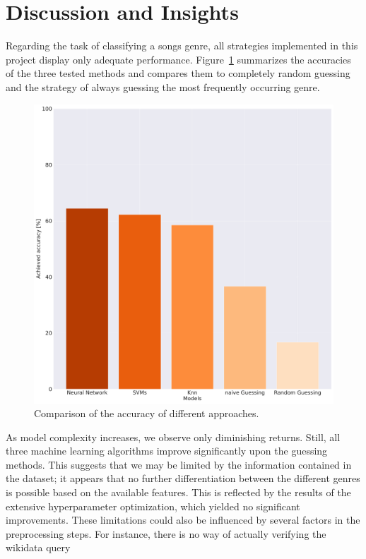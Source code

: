 \documentclass[
  12pt,
  bibliography=totoc,     %
  captions=tableheading,  %
  titlepage=firstiscover, %
]{scrartcl}
\begin{document}
\section{Discussion and Insights}
Regarding the task of classifying a songs genre, all strategies implemented in this project display only adequate performance. Figure~\ref{fig:performance_comp}
summarizes the accuracies of the three tested methods and compares them to completely random guessing and the strategy of always guessing the most frequently occurring
genre.
\begin{figure}[H]
  \centering
  \includegraphics[scale=0.25]{figures/performance-comparison.pdf}
  \caption{Comparison of the accuracy of different approaches.}
  \label{fig:performance_comp}
\end{figure}
\noindent
As model complexity increases, we observe only diminishing returns. Still, all three machine learning algorithms improve significantly upon the guessing
methods. This suggests that we may be  limited by the information contained in the dataset; it appears that no further differentiation between the different genres is
possible based on the available features. This is reflected by the results of the extensive hyperparameter optimization, which yielded no significant improvements.
These limitations could also be influenced by several factors in the preprocessing steps. For instance, there is no way of actually verifying the wikidata query
\end{document}
